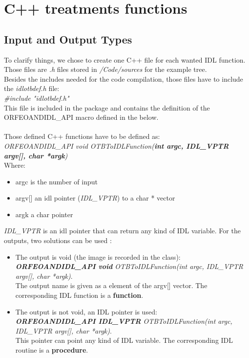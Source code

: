 \section{C++ treatments functions}

\subsection{Input and Output Types}
To clarify things, we chose to create one C++ file for each wanted IDL function. Those files are \emph{.h} files stored in \emph{/Code/sources} 
for the example tree.
\\
Besides the includes needed  for the code compilation, those files have to include the \emph{idlotbdef.h} file: \\
\emph{\#include "idlotbdef.h"}\\
This file is included in the package and contains the definition of the ORFEOANDIDL\_API macro defined in the below.\\
\\
Those defined C++ functions have to be defined as:\\
\emph {ORFEOANDIDL\_API void OTBToIDLFunction(\textbf {int argc, IDL\_VPTR argv[], char *argk})}\\
Where:
\begin{itemize}
    \item argc is the number of input
    \item argv[] an idl pointer (\emph{IDL\_VPTR}) to a char * vector
    \item argk a char pointer
\end{itemize}
\emph{IDL\_VPTR} is an idl pointer that can return any kind of IDL variable.
For the outputs, two solutions can be used :
\begin{itemize}
\item The output is void (the image is recorded in the class): \\ 
\emph {\textbf {ORFEOANDIDL\_API void} OTBToIDLFunction(int argc, IDL\_VPTR argv[], char *argk)}.\\
  The output name is given as a element of the argv[] vector. The corresponding IDL function is a \textbf{function}.
\item The output is not void, an IDL pointer is used: \\ 
\emph {\textbf {ORFEOANDIDL\_API IDL\_VPTR} OTBToIDLFunction(int argc, IDL\_VPTR argv[], char *argk)}.\\
  This pointer can point any kind of IDL variable. The corresponding IDL routine is a \textbf{procedure}.
\end{itemize}
